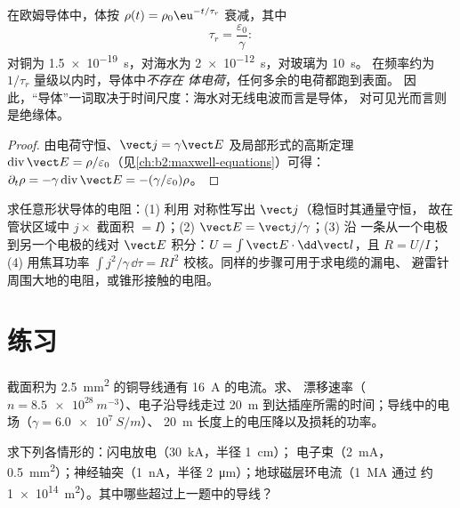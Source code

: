 \begin{proposition}[导体中电荷的弛豫]\label{prop:b2:charges-currents-conduction:relaxation}
在欧姆导体中，体按 $\rho(t) =
\rho_0\eu^{-t/\tau_r}$ 衰减，其中
\[
\tau_r = \frac{\varepsilon_0}{\gamma} :
\]
对铜为 \qty{1.5e-19}{s}，对海水为 \qty{2e-12}{s}，对玻璃为 \qty{10}{s}。
在频率约为 $1/\tau_r$ 量级以内时，导体中\emph{不存在
体电荷}，任何多余的电荷都跑到表面。
因此，“导体”一词取决于时间尺度：海水对无线电波而言是导体，
对可见光而言则是绝缘体。
\end{proposition}

\begin{proof}
由电荷守恒、$\vect j = \gamma\vect E$ 及局部形式的高斯定理
$\operatorname{div}\vect E = \rho/\varepsilon_0$（见\cref{ch:b2:maxwell-equations}）可得：
$\partial_t\rho = -\gamma\operatorname{div}\vect E = -(\gamma/\varepsilon_0)\rho$。
\end{proof}

\begin{method}[由局部定律到积分定律]\label{met:b2:charges-currents-conduction:method}
求任意形状导体的电阻：(1) 利用
对称性写出 $\vect j$（稳恒时其通量守恒，
故在管状区域中 $j \times$ 截面积 $= I$）；(2) $\vect E = \vect j/\gamma$；(3) 沿
一条从一个电极到另一个电极的线对 $\vect E$ 积分：$U = \int\vect E\cdot
\dd\vect l$，且 $R = U/I$；(4) 用焦耳功率 $\int j^2/\gamma\,
\dd\tau = RI^2$ 校核。同样的步骤可用于求电缆的漏电、
避雷针周围大地的电阻，或锥形接触的电阻。
\end{method}

\section{练习}

\begin{exercise}[$\star$]\label{exo:b2:charges-currents-conduction:1}
截面积为 \qty{2.5}{mm^2} 的铜导线通有 \qty{16}{A} 的电流。求、
漂移速率（$n = \qty{8.5e28}{m^{-3}}$）、电子沿导线走过
\qty{20}{m} 到达插座所需的时间；导线中的电场（$\gamma = \qty{6.0e7}{S/m}$）、
\qty{20}{m} 长度上的电压降以及损耗的功率。
\end{exercise}

\begin{exercise}[$\star$]\label{exo:b2:charges-currents-conduction:2}
求下列各情形的：闪电放电（\qty{30}{kA}，半径 \qty{1}{cm}）；
电子束（\qty{2}{mA}，\qty{0.5}{mm^2}）；神经轴突（\qty{1}{nA}，半径
\qty{2}{\micro m}）；地球磁层环电流（\qty{1}{MA} 通过
约 \qty{1e14}{m^2}）。其中哪些超过上一题中的导线？
\end{exercise}

